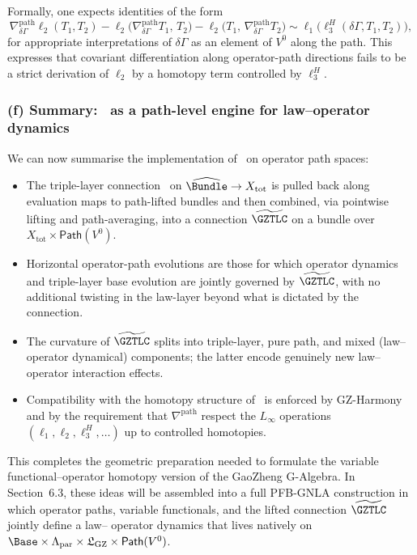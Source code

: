 \documentclass[11pt]{book}
\theoremstyle{plain}
\theoremstyle{definition}
\newcommand{\GZLS}{\ensuremath{\mathfrak{L}_{\mathrm{GZ}}}}       \newcommand{\GZLT}{\ensuremath{M_{!w}}}                           \newcommand{\GZLOC}{\ensuremath{A_M}}                             \newcommand{\GZLCurv}{\ensuremath{\mathcal{F}_{\mathrm{law}}}}
\begin{document}
Formally, one expects identities of the form
\[
   \nabla^{\mathrm{path}}_{\delta\Gamma}
     \ell_2(T_1,T_2)
   -
   \ell_2\bigl(
     \nabla^{\mathrm{path}}_{\delta\Gamma}T_1,\,
     T_2
   \bigr)
   -
   \ell_2\bigl(
     T_1,\,
     \nabla^{\mathrm{path}}_{\delta\Gamma}T_2
   \bigr)
   \sim
   \ell_1\bigl(
     \ell_3^H(\delta\Gamma,T_1,T_2)
   \bigr),
\]
for appropriate interpretations of $\delta\Gamma$ as an element of
$V^0$ along the path. This expresses that covariant differentiation
along operator-path directions fails to be a strict derivation of
$\ell_2$ by a homotopy term controlled by $\ell_3^H$.



\subsubsection*{(f) Summary: \GZTLC\ as a path-level engine for law–operator dynamics}

We can now summarise the implementation of \GZTLC\ on operator path
spaces:

\begin{itemize}
  \item The triple-layer connection \GZTLC\ on
        $\widehat{\Bundle}\to X_{\mathrm{tot}}$ is pulled back along
        evaluation maps to path-lifted bundles and then combined, via
        pointwise lifting and path-averaging, into a connection
        $\widetilde{\GZTLC}$ on a bundle over
        $X_{\mathrm{tot}}\times\mathsf{Path}(V^0)$.
  \item Horizontal operator-path evolutions are those for which
        operator dynamics and triple-layer base evolution are jointly
        governed by $\widetilde{\GZTLC}$, with no additional twisting
        in the law-layer beyond what is dictated by the connection.
  \item The curvature of $\widetilde{\GZTLC}$ splits into triple-layer,
        pure path, and mixed (law–operator dynamical) components; the
        latter encode genuinely new law–operator interaction effects.
  \item Compatibility with the homotopy structure of \GAlgebra\ is
        enforced by GZ-Harmony and by the requirement that
        $\nabla^{\mathrm{path}}$ respect the $L_\infty$ operations
        $(\ell_1,\ell_2,\ell_3^H,\dots)$ up to controlled homotopies.
\end{itemize}

This completes the geometric preparation needed to formulate the
variable functional–operator homotopy version of the GaoZheng
G-Algebra. In Section~6.3, these ideas will be assembled into a full
PFB-GNLA construction in which operator paths, variable functionals,
and the lifted connection $\widetilde{\GZTLC}$ jointly define a law–
operator dynamics that lives natively on
$\Base\times\Lambda_{\mathrm{par}}\times\GZLS\times\mathsf{Path}(V^0)$.
\end{document}
